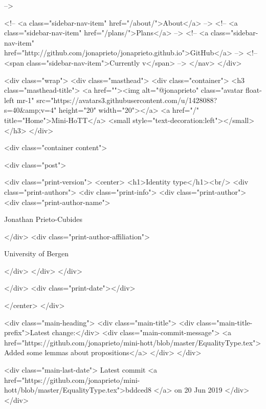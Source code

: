       
     -->

    <!-- <a class="sidebar-nav-item" href="/about/">About</a> -->
    <!-- <a class="sidebar-nav-item" href="/plans/">Plans</a> -->
    <!-- <a class="sidebar-nav-item" href="http://github.com/jonaprieto/jonaprieto.github.io">GitHub</a> -->
    <!-- <span class="sidebar-nav-item">Currently v</span> -->
  </nav>
</div>

    <div class="wrap">
      <div class="masthead">
        <div class="container">
          <h3 class="masthead-title">
            <a href=""><img alt="@jonaprieto" class="avatar float-left mr-1" src="https://avatars3.githubusercontent.com/u/1428088?s=40&amp;v=4" height="20" width="20"></a>
            <a href="/" title="Home">Mini-HoTT</a>
            <small style="text-decoration:left"></small>
          </h3>
        </div>
      
      <div class="container content">
        







<div class="post">

  <div class="print-version">
    <center>
      <h1>Identity type</h1><br/>
        <div class="print-authors">
          <div class="print-info">
            <div class="print-author">
              <div class="print-author-name">
                
                  Jonathan Prieto-Cubides
                
              </div>
              <div class="print-author-affiliation">
                
                  University of Bergen
                
                </div>
            </div>
          </div>
          
          
        </div>
        <div class="print-date"></div>
        
        
    </center>
  </div>

  
  <div class="main-heading">
    <div class="main-title">
      <div class="main-title-prefix">Latest change:</div>
      <div class="main-commit-message">
            <a href="https://github.com/jonaprieto/mini-hott/blob/master/EqualityType.tex">
              Added some lemmas about propositions</a>
      </div>
    </div>

    <div class="main-last-date">
      Latest commit <a href="https://github.com/jonaprieto/mini-hott/blob/master/EqualityType.tex">bddced8 </a> on  20 Jun 2019
    </div>
  </div>
  
